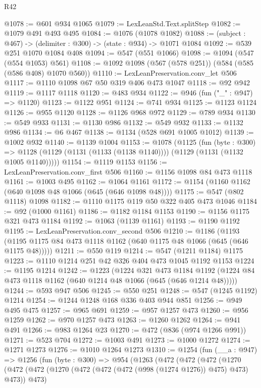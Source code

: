 \begin{lexlean}{R42}
\begin{coremodule}
@1078 := @601 @934 @1065
@1079 := LexLeanStd.Text.splitStep
@1082 := @1079 @491 @493 @495
@1084 := @1076 (@1078 @1082)
@1088 := (subject : @467) -> (delimiter : @300) -> (state : @934) -> @1071 @1084
@1092 := @539 @251 @1070 @1084 @408
@1094 := @547 (@551 @1066)
@1098 := @1094 (@547 (@554 @1053) @561)
@1108 := @1092 @1098 (@567 (@578 @251)) (@584 (@585 (@586 @408) @1070 @560))
@1110 := LexLeanPreservation.conv_let @506
@1117 := @1110 @1098 @67 @50 @319 @406 @473 @1047
@1118 := @92 @942
@1119 := @1117 @1118
@1120 := @483 @934
@1122 := @946 (fun ("_" : @947) => @1120)
@1123 := @1122 @951
@1124 := @741 @934
@1125 := @1123 @1124
@1126 := @955 @1120
@1128 := @1126 @968 @972
@1129 := @789 @934
@1130 := @549 @933
@1131 := @1130 @986
@1132 := @549 @932
@1133 := @1132 @986
@1134 := @6 @467
@1138 := @1134 (@528 @691 @1005 @1012)
@1139 := @1002 @932
@1140 := @1139 @1004
@1153 := @1078
    (@1125
      (fun (byte : @300) =>
      @1128 (@1129 (@1131 (@1133 (@1138 @1140)))) (@1129 (@1131 (@1132 @1005 @1140)))))
@1154 := @1119 @1153
@1156 := LexLeanPreservation.conv_first @506
@1160 := @1156 @1098 @84 @473 @1118
@1161 := @1003 @495
@1162 := @1064 @1161
@1172 := @1154 (@1160 @1162 (@640 @1098 @48 @1066 (@645 (@646 @1098 @48))))
@1175 := @547 (@802 @1118) @1098
@1182 := @1110 @1175 @119 @50 @322 @405 @473 @1046
@1184 := @92 (@1000 @1161)
@1186 := @1182 @1184 @1153
@1190 := @1156 @1175 @321 @473 @1184
@1192 := @1063 (@1139 @1161)
@1193 := @1190 @1192
@1195 := LexLeanPreservation.conv_second @506
@1210 := @1186
    (@1193 (@1195 @1175 @84 @473 @1118 @1162 (@640 @1175 @48 @1066 (@645 (@646 @1175 @48)))))
@1211 := @550 @119
@1214 := @547 (@1211 @1184) @1175
@1223 := @1110 @1214 @251 @42 @326 @404 @473 @1045 @1192 @1153
@1224 := @1195 @1214
@1242 := @1223
    (@1224
      @321
      @473
      @1184
      @1192
      (@1224 @84 @473 @1118 @1162 (@640 @1214 @48 @1066 (@645 (@646 @1214 @48)))))
@1244 := @593 @947 @506
@1245 := @550 @251
@1248 := @547 (@1245 @1192) @1214
@1254 := @1244 @1248 @168 @336 @403 @944 @851
@1256 := @949 @495 @475
@1257 := @965 @691
@1259 := @957 @1257 @473
@1260 := @956 @1259
@1262 := @970 @1257 @473
@1263 := @1260 @1262
@1264 := @941 @491
@1266 := @983 @1264 @23
@1270 := @472 (@836 (@974 @1266 @991))
@1271 := @523 @704
@1272 := @1003 @491
@1273 := @1000 @1272
@1274 := @1271 @1273
@1276 := @1010 @1264 @1273
@1310 := @1254
    (fun (__a : @947) =>
    @1256
      (fun (byte : @300) =>
      @954
        (@1263
          (@472
            (@472
              (@472
                (@1270
                  (@472
                    (@472 (@1270 (@472 (@472 (@472 (@998 (@1274 @1276)) @475) @473) @473)) @473)

\end{coremodule}
\end{lexlean}

